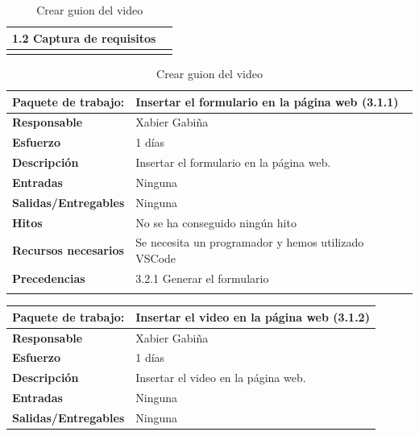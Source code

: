 \documentclass{report}
\begin{document}
\begin{center}
\begin{longtable}{|p{6cm}|p{6cm}|}
                                            1.2 Captura de requisitos\\
                    \hline
                    \caption{Crear guion del video}
                \end{longtable}
                \begin{longtable}{|p{6cm}|p{6cm}|}
                    \hline
                    \textbf{Paquete de trabajo:} & Insertar el formulario en la página web (3.1.1)\\
                    \hline
                    \textbf{Responsable} & Xabier Gabiña\\
                    \hline
                    \textbf{Esfuerzo} & 1 días\\
                    \hline
                    \textbf{Descripción} & Insertar el formulario en la página web.\\
                    \hline
                    \textbf{Entradas} & Ninguna\\
                    \hline
                    \textbf{Salidas/Entregables} & Ninguna \\
                    \hline
                    \textbf{Hitos} & No se ha conseguido ningún hito\\
                    \hline
                    \textbf{Recursos necesarios} & Se necesita un programador y hemos utilizado VSCode\\
                    \hline
                    \textbf{Precedencias} & 3.2.1 Generar el formulario\\
                    \hline
                    \caption{Crear guion del video}
                \end{longtable}
                \clearpage
                \begin{longtable}{|p{6cm}|p{6cm}|}
                    \hline
                    \textbf{Paquete de trabajo:} & Insertar el video en la página web (3.1.2)\\
                    \hline
                    \textbf{Responsable} & Xabier Gabiña\\
                    \hline
                    \textbf{Esfuerzo} & 1 días\\
                    \hline
                    \textbf{Descripción} & Insertar el video en la página web.\\
                    \hline
                    \textbf{Entradas} & Ninguna\\
                    \hline
                    \textbf{Salidas/Entregables} & Ninguna \\

\end{longtable}
\end{center}
\end{document}
